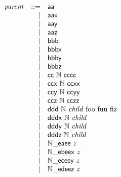 $$
\begin{array}{@{}lrrl@{}l@{}}
& {\mathit{parent}} &::=& \mathsf{aa} \\ &&|&
\mathsf{aax} \\ &&|&
\mathsf{aay} \\ &&|&
\mathsf{aaz} \\ &&|&
\mathsf{bbb} \\ &&|&
\mathsf{bbbx} \\ &&|&
\mathsf{bbby} \\ &&|&
\mathsf{bbbz} \\ &&|&
\mathsf{cc}~\mathbb{N}~\mathsf{cccc} \\ &&|&
\mathsf{ccx}~\mathbb{N}~\mathsf{ccxx} \\ &&|&
\mathsf{ccy}~\mathbb{N}~\mathsf{ccyy} \\ &&|&
\mathsf{ccz}~\mathbb{N}~\mathsf{cczz} \\ &&|&
\mathsf{ddd}~\mathbb{N}~{\mathit{child}}~{\mathrm{foo}}~{\mathrm{fuu}}~{\mathrm{fiz}} \\ &&|&
\mathsf{dddx}~\mathbb{N}~{\mathit{child}} \\ &&|&
\mathsf{dddy}~\mathbb{N}~{\mathit{child}} \\ &&|&
\mathsf{dddz}~\mathbb{N}~{\mathit{child}} \\ &&|&
{\mathbb{N}}{\mathsf{\_}}{\mathsf{ea}}{\mathsf{ee}}~z \\ &&|&
{\mathbb{N}}{\mathsf{\_}}{\mathsf{eb}}{\mathsf{eex}}~z \\ &&|&
{\mathbb{N}}{\mathsf{\_}}{\mathsf{ec}}{\mathsf{eey}}~z \\ &&|&
{\mathbb{N}}{\mathsf{\_}}{\mathsf{ed}}{\mathsf{eez}}~z \\
\end{array}
$$

